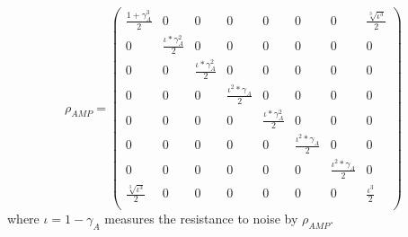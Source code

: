 \documentclass[pra,10pt,twocolumn,superscriptaddress,floatfix,showpacs]{revtex4-1}
\begin{document}
 \begin{widetext}
\begin{equation}\label{pst12}
\rho_{AMP}=\left(\begin{array}{cccccccc}
\frac{1+\gamma_A^3}{2}&0&0&0&0&0 &0&\frac{\sqrt[3]{\iota^3}}{2}\\
0&\frac{\iota*\gamma_A^2}{2} & 0&0&0&0&0&0\\
0&0 & \frac{\iota*\gamma_A^2}{2}&0&0&0&0&0\\
0&0&0&\frac{\iota^2*\gamma_A}{2}&0&0&0&0\\
0&0&0&0&\frac{\iota*\gamma_A^2}{2}&0&0&0\\
0&0&0&0&0&\frac{\iota^2*\gamma_A}{2}&0&0\\
0 &0&0&0&0&0&\frac{\iota^2*\gamma_A}{2} &0\\
\frac{\sqrt[3]{\iota^3}}{2}&0&0&0&0&0&0&\frac{\iota^3}{2}\\
\end{array} \right)
\end{equation}
where $\iota=1-\gamma_A$ measures the resistance to noise by $\rho_{AMP}.$
\end{widetext}
\end{document}
